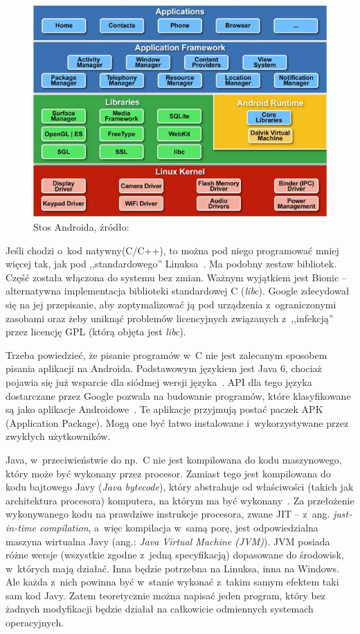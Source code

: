 \begin{figure}
	\centering
		\includegraphics[scale=0.7]{img/android_architecture.jpg}
	\caption{Stos Androida, źródło:~\cite{android-stack}}
	\label{fig:android_architecture}	
\end{figure}

Jeśli chodzi o~kod natywny(C/C++), to można pod niego programować mniej więcej tak, jak pod ,,standardowego'' Linuksa~\cite{learning-android}. Ma podobny zestaw bibliotek. Część została włączona do systemu bez zmian. Ważnym wyjątkiem jest Bionic -- alternatywna implementacja biblioteki standardowej C (\emph{libc}). Google zdecydował się na jej przepisanie, aby zoptymalizować ją pod urządzenia z~ograniczonymi zasobami oraz żeby uniknąć problemów licencyjnych związanych z~,,infekcją'' przez licencję GPL (którą objęta jest \emph{libc}).

Trzeba powiedzieć, że pisanie programów w~C nie jest zalecanym sposobem pisania aplikacji na Androida. Podstawowym językiem jest Java 6, chociaż pojawia się już wsparcie dla siódmej wersji języka~\cite{android-java-7}. API dla tego języka dostarczane przez Google pozwala na budowanie programów, które klasyfikowane są jako aplikacje Androidowe~\cite{learning-android}. Te aplikacje przyjmują postać paczek APK (Application Package). Mogą one być łatwo instalowane i~wykorzystywane przez zwykłych użytkowników.

Java, w~przeciwieństwie do np.~C nie jest kompilowana do kodu maszynowego, który może być wykonany przez procesor. Zamiast tego jest kompilowana do kodu bajtowego Javy (\emph{Java bytecode}), który abstrahuje od właściwości (takich jak architektura procesora) komputera, na którym ma być wykonany~\cite{jvm}. Za przełożenie wykonywanego kodu na prawdziwe instrukcje procesora, zwane JIT -- z~ang. \emph{just-in-time compilation}, a~więc kompilacja w~samą porę, jest odpowiedzialna maszyna wirtualna Javy (ang.: \emph{Java Virtual Machine (JVM)}). JVM posiada różne wersje (wszystkie zgodne z~jedną specyfikacją) dopasowane do środowisk, w~których mają działać. Inna będzie potrzebna na Linuksa, inna na Windows. Ale każda z~nich powinna być w~stanie wykonać z~takim samym efektem taki sam kod Javy. Zatem teoretycznie można napisać jeden program, który bez żadnych modyfikacji będzie działał na całkowicie odmiennych systemach operacyjnych.

